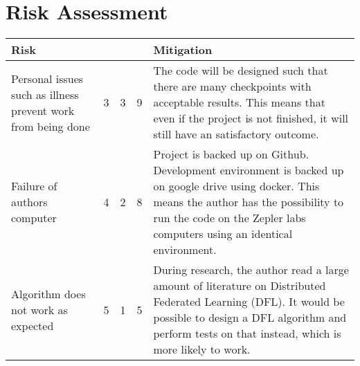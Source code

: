 \section{Risk Assessment}
\begin{table}[H]
	\begin{tabular}{p{4cm}|l|l|l|p{10cm}}
		Risk    & \rotatebox{90}{Severity}  & \rotatebox{90}{Likelihood} & \rotatebox{90}{Score} & Mitigation \\
		\hline \hline
		Personal issues such as illness prevent work from being done & 3        & 3          & 9     & The code will be designed such that there are many checkpoints with acceptable results. This means that even if the project is not finished, it will still have an satisfactory outcome. \\
		\hline
		Failure of authors computer & 4        & 2          & 8     & Project is backed up on Github. Development environment is backed up on google drive using docker. This means the author has the possibility to run the code on the Zepler labs computers using an identical environment. \\
		\hline
		Algorithm does not work as expected & 5        & 1          & 5     & During research, the author read a large amount of literature on Distributed Federated Learning (DFL). It would be possible to design a DFL algorithm and perform tests on that instead, which is more likely to work.   
	\end{tabular}
\end{table}